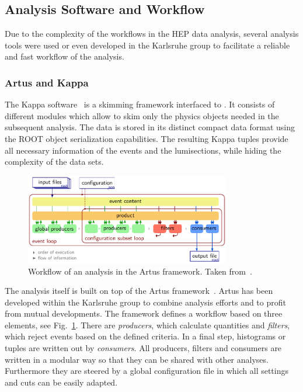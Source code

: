 \subsection{Analysis Software and Workflow}

Due to the complexity of the workflows in the HEP data analysis, several
analysis tools were used or even developed in the Karlsruhe group to facilitate a reliable and
fast workflow of the analysis. 

\subsubsection{Artus and Kappa}
\label{artus_kappa}

The Kappa software~\cite{Kappa:2015aa} is a skimming framework interfaced to
\CMSSW. It consists of different modules which allow to skim only the physics
objects needed in the subsequent analysis. The data is stored in its distinct
compact data format using the ROOT object serialization capabilities. The
resulting Kappa tuples provide all necessary information of the events and the
lumisections, while hiding the complexity of the \CMSSW data sets.

\begin{figure}[tbp]
    \centering
    \includegraphics[width=0.8\textwidth]{figures/experimental_setup/artus_workflow.pdf}
    \caption[Workflow of an analysis in the Artus framework]{Workflow of an
        analysis in the Artus framework. Taken
        from~\cite{Berger:2014aca}.}
    \label{fig:artus_workflow}
\end{figure}

The analysis itself is built on top of the Artus framework~\cite{Berger:2015qao}.
Artus has been developed within the Karlsruhe group to combine analysis efforts
and to profit from mutual developments. The framework defines a workflow based
on three elements, see Fig.~\ref{fig:artus_workflow}. There are
\emph{producers}, which calculate quantities and \emph{filters}, which reject
events based on the defined criteria. In a final step, histograms or tuples are
written out by \emph{consumers}. All producers, filters and consumers are
written in a modular way so that they can be shared with other analyses.
Furthermore they are steered by a global configuration file in which all
settings and cuts can be easily adapted.

